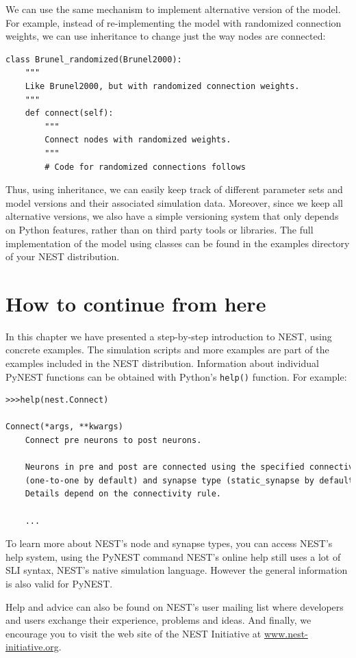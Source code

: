 \documentclass{article}
\begin{document}
We can use the same mechanism to implement alternative version of the
model. For example, instead of re-implementing the model with
randomized connection weights, we can use inheritance to change just the way
nodes are connected:
\begin{lstlisting}[name=brunel-classes]
class Brunel_randomized(Brunel2000):
    """
    Like Brunel2000, but with randomized connection weights.
    """
    def connect(self):
        """
        Connect nodes with randomized weights.
        """
        # Code for randomized connections follows
\end{lstlisting}
Thus, using inheritance, we can easily keep track of different
parameter sets and model versions and their associated simulation
data. Moreover, since we keep all alternative versions, we also have a
simple versioning system that only depends on Python features, rather
than on third party tools or libraries.
The full implementation of the model using classes can be found in the
examples directory of your NEST distribution.

\section{How to continue from here}
In this chapter we have presented a step-by-step introduction to NEST,
using concrete examples. The simulation scripts and more examples are
part of the examples included in the NEST distribution. 
Information about individual PyNEST functions can be obtained with
Python's \lstinline!help()! function. For example:
\begin{lstlisting}[numbers=none,basicstyle=\footnotesize, language=tex]
>>>help(nest.Connect)

Connect(*args, **kwargs)
    Connect pre neurons to post neurons.
    
    Neurons in pre and post are connected using the specified connectivity
    (one-to-one by default) and synapse type (static_synapse by default).
    Details depend on the connectivity rule.
  
    ...  
 \end{lstlisting}

To learn more about NEST's node and synapse types, you can access
NEST's help system, using the PyNEST command NEST's online help still
uses a lot of SLI syntax, NEST's native simulation language. However
the general information is also valid for PyNEST.

Help and advice can also be found on NEST's user mailing list where
developers and users exchange their experience, problems and ideas.
And finally, we encourage you to visit the web site of the NEST
Initiative at \url{www.nest-initiative.org}.
\end{document}
